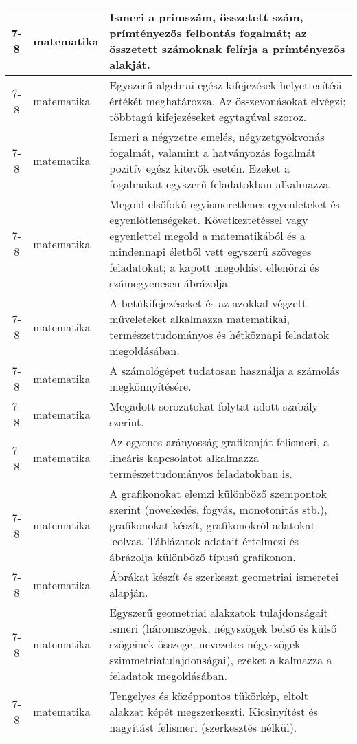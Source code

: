 \begin{small}
\begin{longtable}{c | p{2cm} |  p{11cm} }
              7-8 & matematika & Ismeri a prímszám, összetett szám, prímtényezős felbontás fogalmát; az összetett számoknak felírja a prímtényezős alakját. \\ \hline
              7-8 & matematika & Egyszerű algebrai egész kifejezések helyettesítési értékét meghatározza. Az összevonásokat elvégzi; többtagú kifejezéseket egytagúval szoroz. \\ \hline
              7-8 & matematika & Ismeri a négyzetre emelés, négyzetgyökvonás fogalmát, valamint a hatványozás fogalmát pozitív egész kitevők esetén. Ezeket a fogalmakat egyszerű feladatokban alkalmazza. \\ \hline
              7-8 & matematika & Megold elsőfokú egyismeretlenes egyenleteket és egyenlőtlenségeket. Következtetéssel vagy egyenlettel megold a matematikából és a mindennapi életből vett egyszerű szöveges feladatokat; a kapott megoldást ellenőrzi és számegyenesen ábrázolja. \\ \hline
              7-8 & matematika & A betűkifejezéseket és az azokkal végzett műveleteket alkalmazza matematikai, természettudományos és hétköznapi feladatok megoldásában. \\ \hline
              7-8 & matematika & A számológépet tudatosan használja a számolás megkönnyítésére. \\ \hline
              7-8 & matematika & Megadott sorozatokat folytat adott szabály szerint. \\ \hline
              7-8 & matematika & Az egyenes arányosság grafikonját felismeri, a lineáris kapcsolatot alkalmazza természettudományos feladatokban is. \\ \hline
              7-8 & matematika & A grafikonokat elemzi különböző szempontok szerint (növekedés, fogyás, monotonitás stb.), grafikonokat készít, grafikonokról adatokat leolvas. Táblázatok adatait értelmezi és ábrázolja különböző típusú grafikonon. \\ \hline
              7-8 & matematika & Ábrákat készít és szerkeszt geometriai ismeretei alapján. \\ \hline
              7-8 & matematika & Egyszerű geometriai alakzatok tulajdonságait ismeri (háromszögek, négyszögek belső és külső szögeinek összege, nevezetes négyszögek szimmetriatulajdonságai), ezeket alkalmazza a feladatok megoldásában. \\ \hline
              7-8 & matematika & Tengelyes és középpontos tükörkép, eltolt alakzat képét megszerkeszti. Kicsinyítést és nagyítást felismeri (szerkesztés nélkül). \\ \hline

\end{longtable}
\end{small}

